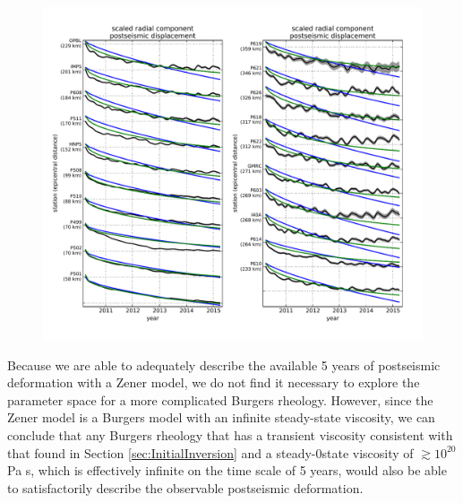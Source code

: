\documentclass[1p]{elsarticle}
\begin{document}
\begin{figure}
\includegraphics[scale=0.8]{Figures/RecordSectionFinal}
\centering 
\caption{}
\label{fig:RecordSection2}
\end{figure} 

Because we are able to adequately describe the available 5 years of postseismic deformation with a Zener model, we do not find it necessary to explore the parameter space for a more complicated Burgers rheology.  However, since the Zener model is a Burgers model with an infinite steady-state viscosity, we can conclude that any Burgers rheology that has a transient viscosity consistent with that found in Section \ref{sec:InitialInversion} and a steady-0state viscosity of $\gtrsim10^{20}$ Pa s, which is effectively infinite on the time scale of 5 years, would also be able to satisfactorily describe the observable postseismic deformation.        
  
\end{document}
